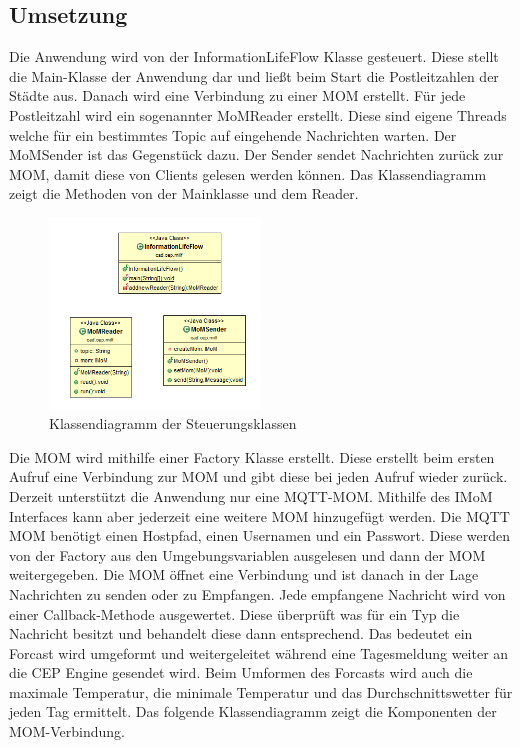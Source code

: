 \subsection{Umsetzung}
Die Anwendung wird von der InformationLifeFlow Klasse gesteuert. Diese stellt die Main-Klasse der Anwendung dar und ließt beim Start die Postleitzahlen der Städte aus. Danach wird eine Verbindung zu einer MOM erstellt. Für jede Postleitzahl wird ein sogenannter MoMReader erstellt. Diese sind eigene Threads welche für ein bestimmtes Topic auf eingehende Nachrichten warten. Der MoMSender ist das Gegenstück dazu. Der Sender sendet Nachrichten zurück zur MOM, damit diese von Clients gelesen werden können. Das Klassendiagramm zeigt die Methoden von der Mainklasse und dem Reader.
\begin{figure}[htbp]
	\centering
	\includegraphics[width=0.5\textwidth]{Bilder/FlowAndReader.png}
	\caption{Klassendiagramm der Steuerungsklassen}
	\label{img:flowDiagramm}
\end{figure} 
Die MOM wird mithilfe einer Factory Klasse erstellt. Diese erstellt beim ersten Aufruf eine Verbindung zur MOM und gibt diese bei jeden Aufruf wieder zurück. Derzeit unterstützt die Anwendung nur eine MQTT-MOM. Mithilfe des IMoM Interfaces kann aber jederzeit eine weitere MOM hinzugefügt werden. Die MQTT MOM benötigt einen Hostpfad, einen Usernamen und ein Passwort. Diese werden von der Factory aus den Umgebungsvariablen ausgelesen und dann der MOM weitergegeben. Die MOM öffnet eine Verbindung und ist danach in der Lage Nachrichten zu senden oder zu Empfangen. Jede empfangene Nachricht wird von einer Callback-Methode ausgewertet. Diese überprüft was für ein Typ die Nachricht besitzt und behandelt diese dann entsprechend. Das bedeutet ein Forcast wird umgeformt und weitergeleitet während eine Tagesmeldung weiter an die CEP Engine gesendet wird. Beim Umformen des Forcasts wird auch die maximale Temperatur, die minimale Temperatur und das Durchschnittswetter für jeden Tag ermittelt. Das folgende Klassendiagramm zeigt die Komponenten der MOM-Verbindung.
